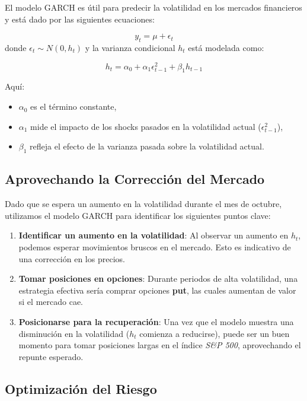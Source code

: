 \documentclass{article}
\begin{document}
El modelo GARCH es útil para predecir la volatilidad en los mercados financieros y está dado por las siguientes ecuaciones:

\begin{equation}
    y_t = \mu + \epsilon_t
\end{equation}
donde \( \epsilon_t \sim N(0, h_t) \) y la varianza condicional \( h_t \) está modelada como:

\begin{equation}
    h_t = \alpha_0 + \alpha_1 \epsilon_{t-1}^2 + \beta_1 h_{t-1}
\end{equation}

Aquí:
\begin{itemize}
    \item \( \alpha_0 \) es el término constante,
    \item \( \alpha_1 \) mide el impacto de los shocks pasados en la volatilidad actual (\( \epsilon_{t-1}^2 \)),
    \item \( \beta_1 \) refleja el efecto de la varianza pasada sobre la volatilidad actual.
\end{itemize}

\subsection{Aprovechando la Corrección del Mercado}

Dado que se espera un aumento en la volatilidad durante el mes de octubre, utilizamos el modelo GARCH para identificar los siguientes puntos clave:

\begin{enumerate}
    \item \textbf{Identificar un aumento en la volatilidad}: Al observar un aumento en \( h_t \), podemos esperar movimientos bruscos en el mercado. Esto es indicativo de una corrección en los precios.
    \item \textbf{Tomar posiciones en opciones}: Durante periodos de alta volatilidad, una estrategia efectiva sería comprar opciones \textbf{put}, las cuales aumentan de valor si el mercado cae.
    \item \textbf{Posicionarse para la recuperación}: Una vez que el modelo muestra una disminución en la volatilidad (\( h_t \) comienza a reducirse), puede ser un buen momento para tomar posiciones largas en el índice \textit{S\&P 500}, aprovechando el repunte esperado.
\end{enumerate}

\subsection{Optimización del Riesgo}
\end{document}
